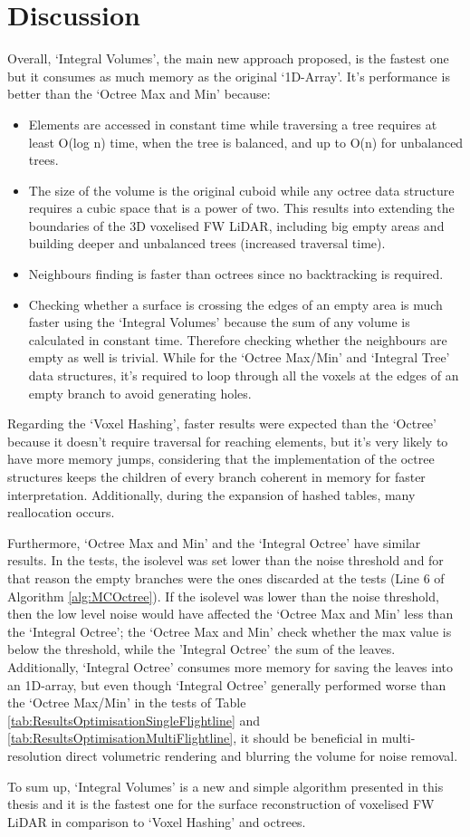 \documentclass{subfiles}
\begin{document}
\section{Discussion}\label{sec:Opt:Discussion}

\par Overall, `Integral Volumes', the main new approach proposed, is the fastest one but it consumes as much memory as the original `1D-Array'. It's performance is better than the `Octree Max and Min' because:

\begin{itemize}
	\item Elements are accessed in constant time while traversing a tree requires at least O(log n) time, when the tree is balanced, and up to O(n) for unbalanced trees.
	\item The size of the volume is the original cuboid while any octree data structure requires a cubic space that is a power of two. This results into extending the boundaries of the 3D voxelised FW LiDAR, including big empty areas and building deeper and unbalanced trees (increased traversal time).
	\item Neighbours finding is faster than octrees since no backtracking is required. 
	\item Checking whether a surface is crossing the edges of an empty area is much faster using the `Integral Volumes' because the sum of any volume is calculated in constant time. Therefore checking whether the neighbours are empty as well is trivial. While for the `Octree Max/Min' and `Integral Tree' data structures, it's required to loop through all the voxels at the edges of an empty branch to avoid generating holes. 
\end{itemize}

\par Regarding the `Voxel Hashing', faster results were expected than the `Octree' because it doesn't require traversal for reaching elements, but it's very likely to have more memory jumps, considering that the implementation of the octree structures keeps the children of every branch coherent in memory for faster interpretation. Additionally, during the expansion of hashed tables, many reallocation occurs. 

\par Furthermore, `Octree Max and Min' and the `Integral Octree' have similar results. In the tests, the isolevel was set lower than the noise threshold and for that reason the empty branches were the ones discarded at the tests (Line 6 of Algorithm \ref{alg:MCOctree}). If the isolevel was lower than the noise threshold, then the low level noise would have affected the `Octree Max and Min' less than the `Integral Octree'; the `Octree Max and Min' check whether the max value is below the threshold, while the 'Integral Octree' the sum of the leaves. Additionally, `Integral Octree' consumes more memory for saving the leaves into an 1D-array, but even though `Integral Octree' generally performed worse than the `Octree Max/Min' in the tests of Table \ref{tab:ResultsOptimisationSingleFlightline} and \ref{tab:ResultsOptimisationMultiFlightline}, it should be beneficial in multi-resolution direct volumetric rendering and blurring the volume for noise removal. 

\par To sum up, `Integral Volumes' is a new and simple algorithm presented in this thesis and it is the fastest one for the surface reconstruction of voxelised FW LiDAR in comparison to `Voxel Hashing' and octrees. 
\end{document}
